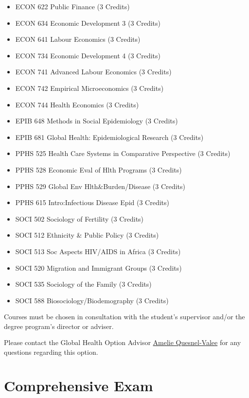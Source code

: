 \documentclass[
]{book}
\providecommand{\tightlist}{%
  \setlength{\itemsep}{0pt}\setlength{\parskip}{0pt}}
\begin{document}
\begin{itemize}
\tightlist
\item
  ECON 622 Public Finance (3 Credits)
\item
  ECON 634 Economic Development 3 (3 Credits)
\item
  ECON 641 Labour Economics (3 Credits)
\item
  ECON 734 Economic Development 4 (3 Credits)
\item
  ECON 741 Advanced Labour Economics (3 Credits)
\item
  ECON 742 Empirical Microeconomics (3 Credits)
\item
  ECON 744 Health Economics (3 Credits)
\item
  EPIB 648 Methods in Social Epidemiology (3 Credits)
\item
  EPIB 681 Global Health: Epidemiological Research (3 Credits)
\item
  PPHS 525 Health Care Systems in Comparative Perspective (3 Credits)
\item
  PPHS 528 Economic Eval of Hlth Programs (3 Credits)
\item
  PPHS 529 Global Env Hlth\&Burden/Disease (3 Credits)
\item
  PPHS 615 Intro:Infectious Disease Epid (3 Credits)
\item
  SOCI 502 Sociology of Fertility (3 Credits)
\item
  SOCI 512 Ethnicity \& Public Policy (3 Credits)
\item
  SOCI 513 Soc Aspects HIV/AIDS in Africa (3 Credits)
\item
  SOCI 520 Migration and Immigrant Groups (3 Credits)
\item
  SOCI 535 Sociology of the Family (3 Credits)
\item
  SOCI 588 Biosociology/Biodemography (3 Credits)
\end{itemize}

Courses must be chosen in consultation with the student's supervisor and/or the degree program's director or adviser.

Please contact the Global Health Option Advisor \href{mailto:amelie.quesnelvallee@mcgill.ca}{Amelie Quesnel-Valee} for any questions regarding this option.

\hypertarget{comprehensive-exam}{%
\chapter{Comprehensive Exam}\label{comprehensive-exam}}
\end{document}

